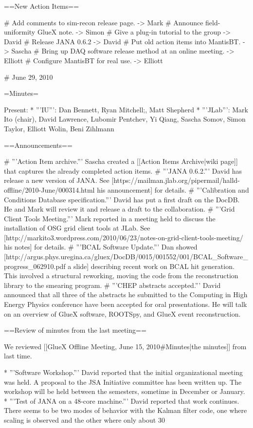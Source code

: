 ==New Action Items==

# Add comments to sim-recon release page. -> Mark
# Announce field-uniformity GlueX note. -> Simon
# Give a plug-in tutorial to the group -> David
# Release JANA 0.6.2 -> David
# Put old action items into MantisBT. -> Sascha
# Bring up DAQ software release method at an online meeting. -> Elliott
# Configure MantisBT for real use. -> Elliott


# June 29, 2010

=Minutes=


Present:
* '''IU''': Dan Bennett, Ryan Mitchell;, Matt Shepherd
* '''JLab''': Mark Ito (chair), David Lawrence, Lubomir Pentchev, Yi Qiang, Sascha Somov, Simon Taylor, Elliott Wolin, Beni Zihlmann

==Announcements==

# '''Action Item archive.''' Sascha created a [[Action Items Archive|wiki page]] that captures the already completed action items.
# '''JANA 0.6.2.''' David has release a new version of JANA. See [https://mailman.jlab.org/pipermail/halld-offline/2010-June/000314.html his announcement] for details.
# '''Calibration and Conditions Database specification.''' David has put a first draft on the DocDB. He and Mark will review it and release a draft to the collaboration.
# '''Grid Client Tools Meeting.''' Mark reported in a meeting held to discuss the installation of OSG grid client tools at JLab. See [http://markito3.wordpress.com/2010/06/23/notes-on-grid-client-tools-meeting/ his notes] for details.
# '''BCAL Software Update.''' Dan showed [http://argus.phys.uregina.ca/gluex/DocDB/0015/001552/001/BCAL_Software_progress_062910.pdf a slide] describing recent work on BCAL hit generation. This involved a structural reworking, moving the code from the reconstruction library to the smearing program.
# '''CHEP abstracts accepted.''' David announced that all three of the abstracts he submitted to the Computing in High Energy Physics conference have been accepted for oral presentations. He will talk on an overview of GlueX software, ROOTSpy, and GlueX event reconstruction.

==Review of minutes from the last meeting==

We reviewed [[GlueX Offline Meeting, June 15, 2010#Minutes|the minutes]] from last time.

* '''Software Workshop.''' David reported that the initial organizational meeting was held. A proposal to the JSA Initiative committee has been written up. The workshop will 
be held between the semesters, sometime in December or January.
* '''Test of JANA on a 48-core machine.''' David reported that work continues. There seems to be two modes of behavior with the Kalman filter code, one where scaling is observed and the other where only about 30%

